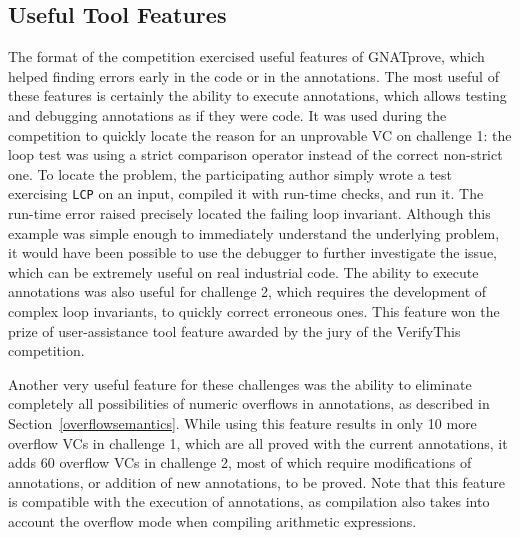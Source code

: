 \documentclass[sttt,draft]{svjour}
\newcommand{\gnatprove}{GNATprove\xspace}
\begin{document}

\subsection{Useful Tool Features}

The format of the competition exercised useful features of \gnatprove, which
helped finding errors early in the code or in the annotations. The most useful
of these features is certainly the ability to execute annotations, which allows
testing and debugging annotations as if they were code. It was used during the
competition to quickly locate the reason for an unprovable VC on challenge 1:
the loop test was using a strict comparison operator instead of the correct
non-strict one. To locate the problem, the participating author simply wrote a
test exercising \verb|LCP| on an input, compiled it with run-time checks, and
run it. The run-time error raised precisely located the failing loop
invariant. Although this example was simple enough to immediately understand
the underlying problem, it would have been possible to use the debugger to
further investigate the issue, which can be extremely useful on real industrial
code. The ability to execute annotations was also useful for challenge 2, which
requires the development of complex loop invariants, to quickly correct
erroneous ones. This feature won the prize of user-assistance tool feature
awarded by the jury of the VerifyThis competition.

Another very useful feature for these challenges was the ability to eliminate
completely all possibilities of numeric overflows in annotations, as described
in Section~\ref{overflowsemantics}. While using this feature results in only 10
more overflow VCs in challenge 1, which are all proved with the current
annotations, it adds 60 overflow VCs in challenge 2, most of which require
modifications of annotations, or addition of new annotations, to be
proved. Note that this feature is compatible with the execution of annotations,
as compilation also takes into account the overflow mode when compiling
arithmetic expressions.
\end{document}
